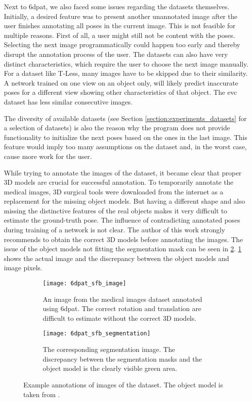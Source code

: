 Next to \ac{6dpat}, we also faced some issues regarding the datasets themselves. Initially, a desired feature was to present another unannotated image after the user finishes annotating all poses in the current image. This is not feasible for multiple reasons. First of all, a user might still not be content with the poses. Selecting the next image programmatically could happen too early and thereby disrupt the annotation process of the user. The datasets can also have very distinct characteristics, which require the user to choose the next image manually. For a dataset like T-Less, many images have to be skipped due to their similarity. A network trained on one view on an object only, will likely predict inaccurate poses for a different view showing other characteristics of that object. The \ac{evc} dataset has less similar consecutive images.

The diversity of available datasets (see Section \ref{section:experiments_datasets} for a selection of datasets) is also the reason why the program does not provide functionality to initialize the next poses based on the ones in the last image. This feature would imply too many assumptions on the dataset and, in the worst case, cause more work for the user. 

While trying to annotate the images of the  dataset, it became clear that proper 3D models are crucial for successful annotation. To temporarily annotate the medical images, 3D surgical tools were downloaded from the internet as a replacement for the missing object models. But having a different shape and also missing the distinctive features of the real objects makes it very difficult to estimate the ground-truth pose. The influence of contradicting annotated poses during training of a network is not clear. The author of this work strongly recommends to obtain the correct 3D models before annotating the  images. The issue of the object models not fitting the segmentation mask can be seen in \fig \ref{fig:6dpat_sfb_segmentation}. \fig \ref{fig:6dpat_sfb_image} shows the actual image and the discrepancy between the object models and image pixels.

\begin{figure}
	\begin{subfigure}[t]{0.47\textwidth}
		\centering
    	\texttt{[image: 6dpat\_sfb\_image]}
    	\caption{An image from the medical images dataset annotated using \ac{6dpat}. The correct rotation and translation are difficult to estimate without the correct 3D models.}
    	\label{fig:6dpat_sfb_image}
	\end{subfigure} 
	\hfill
	\begin{subfigure}[t]{0.47\textwidth}
		\centering
    	\texttt{[image: 6dpat\_sfb\_segmentation]}
    	\caption{The corresponding segmentation image. The discrepancy between the segmentation masks and the object model is the clearly visible green area.}
    	\label{fig:6dpat_sfb_segmentation}
	\end{subfigure} 
	\caption{Example annotations of images of the  dataset. The object model is taken from \cite{3d_scalpel_online}.}
	\label{fig:6dpat_sfb}
\end{figure} 


